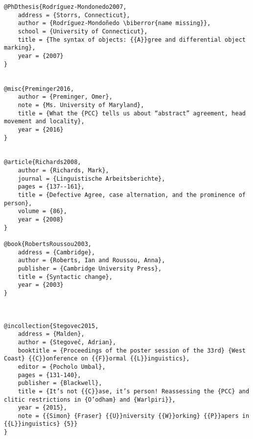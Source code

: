 \documentclass[output=paper,modfonts,nonflat,newtxmath]{langsci/langscibook}
\begin{document}
\begin{verbatim}
@PhDthesis{Rodríguez-Mondonedo2007,
	address = {Storrs, Connecticut},
	author = {Rodríguez-Mondoñedo \biberror{name missing}},
	school = {University of Connecticut},
	title = {The syntax of objects: {{A}}gree and differential object marking},
	year = {2007}
}


@misc{Preminger2016,
	author = {Preminger, Omer},
	note = {Ms. University of Maryland},
	title = {What the {PCC} tells us about “abstract” agreement, head movement and locality},
	year = {2016}
}


@article{Richards2008,
	author = {Richards, Mark},
	journal = {Linguistische Arbeitsberichte},
	pages = {137--161},
	title = {Defective Agree, case alternation, and the prominence of person},
	volume = {86},
	year = {2008}
}

@book{RobertsRoussou2003,
	address = {Cambridge},
	author = {Roberts, Ian and Roussou, Anna},
	publisher = {Cambridge University Press},
	title = {Syntactic change},
	year = {2003}
} 



@incollection{Stegovec2015,
	address = {Malden},
	author = {Stegoveč, Adrian},
	booktitle = {Proceedings of the poster session of the 33rd} {West Coast} {{C}}onference on {{F}}ormal {{L}}inguistics},
	editor = {Pocholo Umbal},
	pages = {131-140},
	publisher = {Blackwell},
	title = {It’s not {{C}}ase, it’s person! Reassessing the {PCC} and clitic restrictions in {O’odham} and {Warlpiri}},
	year = {2015},
	note = {{Simon} {Fraser} {{U}}niversity {{W}}orking} {{P}}apers in {{L}}inguistics} {5}}
}


\end{verbatim}
\sloppy\printbibliography[heading=subbibliography,notkeyword=this]
\end{document}
